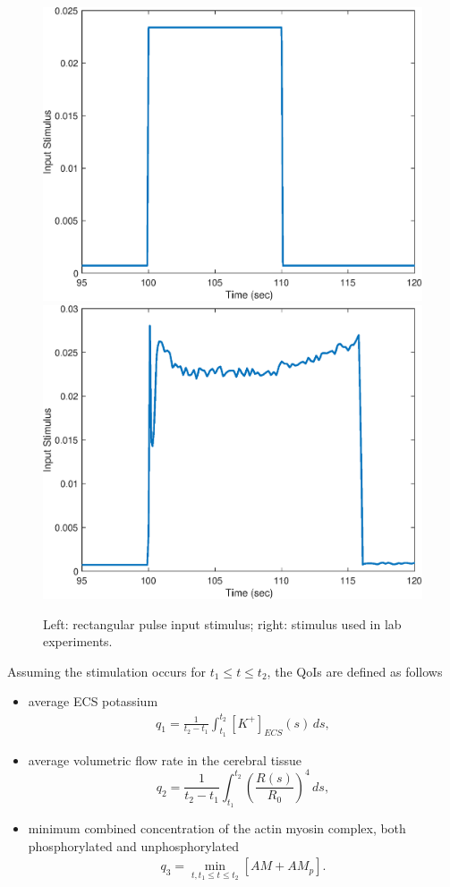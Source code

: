 
\begin{figure}[h]
\centering
\includegraphics[width=.4 \textwidth]{Figures/Rectangular_Stimulus.eps}
\includegraphics[width=.4 \textwidth]{Figures/Experimental_Stimulus.eps}
\caption{Left: rectangular pulse input stimulus; right: stimulus used in lab experiments.}
\label{input_stimuli}
\end{figure}

 Assuming the stimulation occurs for $t_1\le t \le t_2$, the QoIs are defined as follows
 \begin{itemize}
\item average ECS potassium 
\begin{eqnarray}
 q_1 = \frac{1}{t_2-t_1}\int_{t_1}^{t_2}[K^+]_{ECS}(s)\, ds, \label{K_ECS_Mean}
\end{eqnarray}
\item average volumetric flow rate in the cerebral tissue
\begin{equation}
 q_2 = \frac{1}{t_2-t_1}\int_{t_1}^{t_2}\left(\frac{R(s)}{R_0}\right)^4\, ds, \label{vol_flow}
\end{equation}
 \item minimum combined concentration of the actin myosin complex, both phosphorylated and unphosphorylated
\begin{eqnarray}
q_3 = \min _{t, t_1\le t \le t_2} [AM+AM_p]. \label{AM_AMp_Min}
\end{eqnarray}
\end{itemize}

